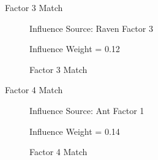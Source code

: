 \documentclass[handout]{beamer}
\begin{document}
\begin{frame}{Factor 3 Match}
\begin{figure}%
    \centering
    \qquad
    \caption{Factor 3 Match}%
    \label{fig:com3}%
    Influence Source: Raven Factor 3 
    \par Influence Weight = 0.12
\end{figure}
\end{frame}

\begin{frame}{Factor 4 Match}
\begin{figure}%
    \centering
    \qquad
    \caption{Factor 4 Match}%
    \label{fig:com4}%
    Influence Source: Ant Factor 1 
    \par Influence Weight = 0.14
\end{figure}
\end{frame}
\end{document}
